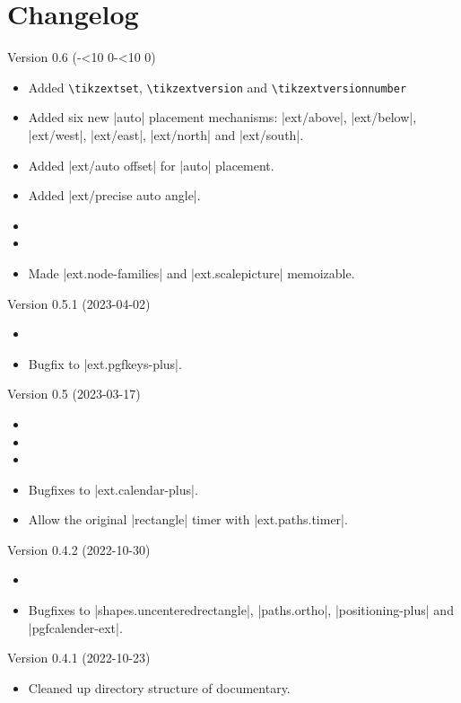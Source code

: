 \section*{Changelog}
\begin{multicols}{2}\raggedright
\noindent
Version 0.6 (\the\year-\ifnum\month<10 0\fi\the\month-\ifnum\day<10 0\fi\the\day)
\begin{itemize}
\item Added \texttt{\textbackslash tikzextset},
            \texttt{\textbackslash tikzextversion} and
            \texttt{\textbackslash tikzextversionnumber}
\item Added six new |auto| placement mechanisms:
      |ext/above|, |ext/below|, |ext/west|, |ext/east|, |ext/north| and |ext/south|.
\item Added |ext/auto offset| for |auto| placement.
\item Added |ext/precise auto angle|.
\item {}
\item {}
\item Made |ext.node-families| and |ext.scalepicture| memoizable.
\end{itemize}
Version 0.5.1 (2023-04-02)
\begin{itemize}
\item {}
\item Bugfix to |ext.pgfkeys-plus|. \cite{GH6}
\end{itemize}
Version 0.5 (2023-03-17)
\begin{itemize}
\item {}
\item {}
\item {}
\item Bugfixes to |ext.calendar-plus|.
\item Allow the original |rectangle| timer with |ext.paths.timer|.
\end{itemize}
Version 0.4.2 (2022-10-30)
\begin{itemize}
\item {}
\item Bugfixes to |shapes.uncenteredrectangle|, |paths.ortho|, |positioning-plus| and |pgfcalender-ext|.
\end{itemize}
Version 0.4.1 (2022-10-23)
\begin{itemize}
\item Cleaned up directory structure of documentary.

\end{itemize}
\end{multicols}
